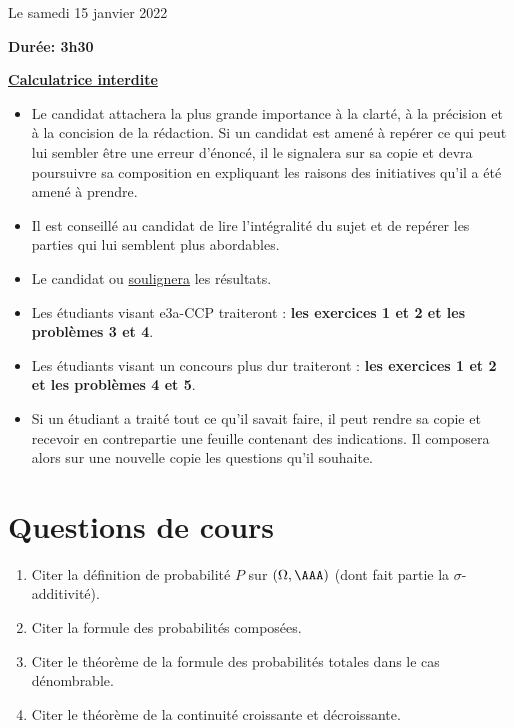 \documentclass[twoside,french,11pt]{VcCours}
\begin{document}

\begin{center}
\large 
Le samedi 15 janvier 2022

\bigskip
\textbf{Durée: 3h30}

\bigskip
\large\underline{\textbf{Calculatrice interdite}}
\end{center}

\bigskip
\begin{itemize}
  \item Le candidat attachera la plus grande importance à la clarté, à la précision et à la concision de la rédaction. Si un candidat est amené à repérer ce qui peut lui sembler être une erreur d'énoncé, il le signalera sur sa copie et devra poursuivre sa composition en expliquant les raisons des initiatives qu'il a été amené à prendre.
  \item Il est conseillé au candidat de lire l'intégralité du sujet et de repérer les parties qui lui semblent plus abordables.
  \item Le candidat  ou \underline{soulignera} les résultats.
  \item Les étudiants visant e3a-CCP traiteront : \textbf{les exercices 1 et 2 et les problèmes 3 et 4}.
  \item Les étudiants visant un concours plus dur traiteront :
  \textbf{les exercices 1 et 2 et les problèmes 4 et 5}.
  \item Si un étudiant a traité tout ce qu'il savait faire, il peut rendre sa copie et recevoir en contrepartie une feuille
  contenant des indications. Il composera alors sur une nouvelle copie les questions qu'il souhaite.
  \end{itemize}
\separationTitre

\vspace{1cm}
\section*{Questions de cours}
\begin{enumerate}
  \item Citer la définition de probabilité $P$ sur $(\Omega,\AAA)$ (dont fait partie la $\sigma$-additivité).
  \item Citer la formule des probabilités composées.
  \item Citer le théorème de la formule des probabilités totales dans le cas dénombrable.
  \item Citer le théorème de la continuité croissante et décroissante.
\end{enumerate}
\end{document}
